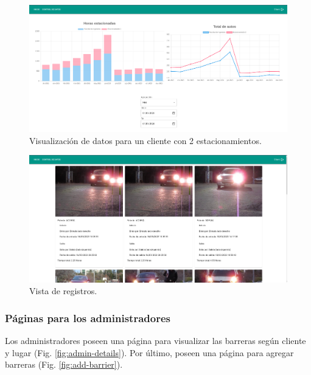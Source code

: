 \begin{figure}[bth]
    \centering
    \includegraphics[width=\textwidth]{imgs/server/resume.png}
    \caption{Visualización de datos para un cliente con 2 estacionamientos.}
    \label{fig:dashboard}
\end{figure}

\begin{figure}[bth]
    \centering
    \includegraphics[width=\textwidth]{imgs/server/registers.png}
    \caption{Vista de registros.}
    \label{fig:registers}
\end{figure}



\subsubsection{Páginas para los administradores}

Los administradores poseen una página para visualizar las barreras según cliente y lugar (Fig. \ref{fig:admin-details}). Por último, poseen una página para agregar barreras (Fig. \ref{fig:add-barrier}).

